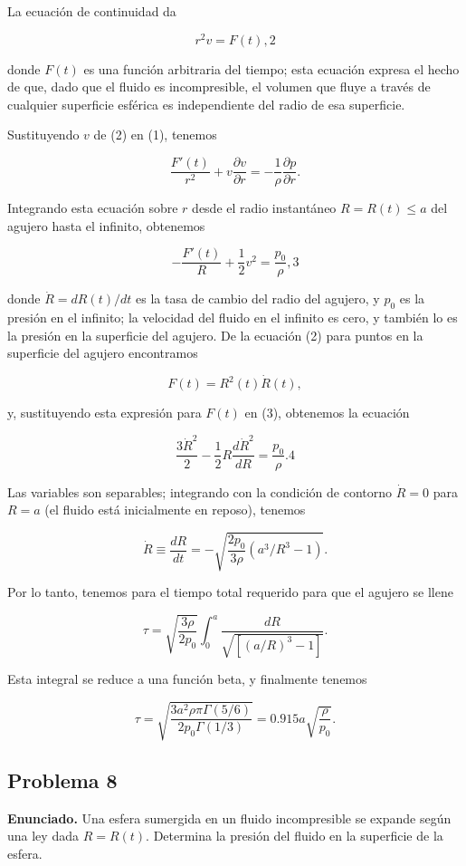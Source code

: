 \documentclass{article}
\begin{document}
La ecuación de continuidad da

$$
r^2 v = F(t), {2}
$$

donde $F(t)$ es una función arbitraria del tiempo; esta ecuación expresa el hecho de que, dado que el fluido es incompresible, el volumen que fluye a través de cualquier superficie esférica es independiente del radio de esa superficie.

Sustituyendo $v$ de (2) en (1), tenemos

$$
\frac{F'(t)}{r^2} + v \frac{\partial v}{\partial r} = -\frac{1}{\rho} \frac{\partial p}{\partial r}.
$$

Integrando esta ecuación sobre $r$ desde el radio instantáneo $R = R(t) \leq a$ del agujero hasta el infinito, obtenemos

$$
-\frac{F'(t)}{R} + \frac{1}{2} v^2 = \frac{p_0}{\rho}, {3}
$$

donde $\dot{R} = dR(t)/dt$ es la tasa de cambio del radio del agujero, y $p_0$ es la presión en el infinito; la velocidad del fluido en el infinito es cero, y también lo es la presión en la superficie del agujero. De la ecuación (2) para puntos en la superficie del agujero encontramos

$$
F(t) = R^2(t) \dot{R}(t),
$$

y, sustituyendo esta expresión para $F(t)$ en (3), obtenemos la ecuación

$$
\frac{3\dot{R}^2}{2} - \frac{1}{2} R \frac{d\dot{R}^2}{dR} = \frac{p_0}{\rho}. {4}
$$

Las variables son separables; integrando con la condición de contorno $\dot{R} = 0$ para $R = a$ (el fluido está inicialmente en reposo), tenemos

$$
\dot{R} \equiv \frac{dR}{dt} = -\sqrt{\frac{2p_0}{3\rho} \left( a^3/R^3 - 1 \right)}.
$$

Por lo tanto, tenemos para el tiempo total requerido para que el agujero se llene

$$
\tau = \sqrt{\frac{3\rho}{2p_0}} \int_0^a \frac{dR}{\sqrt{[(a/R)^3 - 1]}}.
$$

Esta integral se reduce a una función beta, y finalmente tenemos

$$
\tau = \sqrt{\frac{3a^2 \rho \pi \Gamma(5/6)}{2p_0 \Gamma(1/3)}} = 0.915a \sqrt{\frac{\rho}{p_0}}.
$$

\subsection*{Problema 8}

\textbf{Enunciado.} Una esfera sumergida en un fluido incompresible se expande según una ley dada $R = R(t)$. Determina la presión del fluido en la superficie de la esfera.
\end{document}
